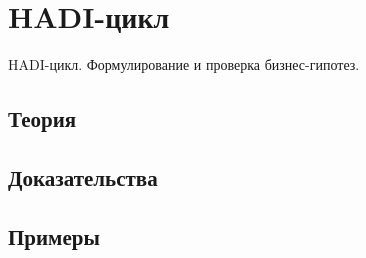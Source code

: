 
\section{HADI-цикл}
\label{sec:2.6.10-hadi-cycle}

\begin{ticket}
HADI-цикл. Формулирование и проверка бизнес-гипотез.
\end{ticket}

\subsection*{Теория}

\subsection*{Доказательства}

\subsection*{Примеры}
